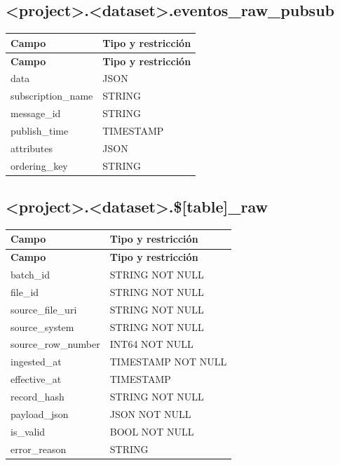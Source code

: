 \documentclass[11pt]{article}
\begin{document}
\subsection{<project>.<dataset>.eventos\_\allowbreak{}raw\_\allowbreak{}pubsub}

\begingroup\small
\begin{longtable}{@{}>{\raggedright\arraybackslash}p{}>{\raggedright\arraybackslash}p{}@{}}
\toprule
\textbf{Campo} & \textbf{Tipo y restricción} \\
\midrule
\endfirsthead
\toprule
\textbf{Campo} & \textbf{Tipo y restricción} \\
\midrule
\endhead
data & JSON \\
subscription\_\allowbreak{}name & STRING \\
message\_\allowbreak{}id & STRING \\
publish\_\allowbreak{}time & TIMESTAMP \\
attributes & JSON \\
ordering\_\allowbreak{}key & STRING \\
\bottomrule
\end{longtable}
\endgroup

\subsection{<project>.<dataset>.\$[table]\_\allowbreak{}raw}

\begingroup\small
\begin{longtable}{@{}>{\raggedright\arraybackslash}p{}>{\raggedright\arraybackslash}p{}@{}}
\toprule
\textbf{Campo} & \textbf{Tipo y restricción} \\
\midrule
\endfirsthead
\toprule
\textbf{Campo} & \textbf{Tipo y restricción} \\
\midrule
\endhead
batch\_\allowbreak{}id & STRING NOT NULL \\
file\_\allowbreak{}id & STRING NOT NULL \\
source\_\allowbreak{}file\_\allowbreak{}uri & STRING NOT NULL \\
source\_\allowbreak{}system & STRING NOT NULL \\
source\_\allowbreak{}row\_\allowbreak{}number & INT64 NOT NULL \\
ingested\_\allowbreak{}at & TIMESTAMP NOT NULL \\
effective\_\allowbreak{}at & TIMESTAMP \\
record\_\allowbreak{}hash & STRING NOT NULL \\
payload\_\allowbreak{}json & JSON NOT NULL \\
is\_\allowbreak{}valid & BOOL NOT NULL \\
error\_\allowbreak{}reason & STRING \\
\bottomrule
\end{longtable}
\endgroup
\end{document}
